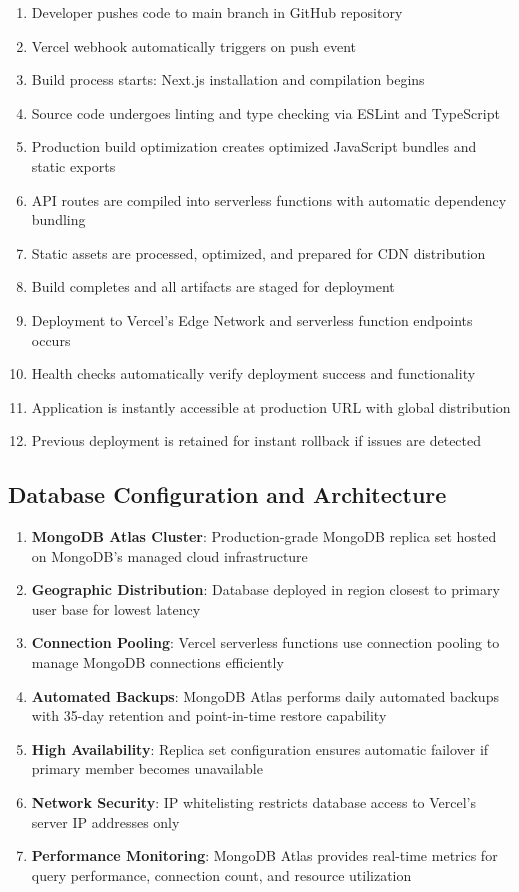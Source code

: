 \documentclass[12pt,a4paper]{report}
\begin{document}
\begin{enumerate}[label=\roman*)]
    \item Developer pushes code to main branch in GitHub repository
    \item Vercel webhook automatically triggers on push event
    \item Build process starts: Next.js installation and compilation begins
    \item Source code undergoes linting and type checking via ESLint and TypeScript
    \item Production build optimization creates optimized JavaScript bundles and static exports
    \item API routes are compiled into serverless functions with automatic dependency bundling
    \item Static assets are processed, optimized, and prepared for CDN distribution
    \item Build completes and all artifacts are staged for deployment
    \item Deployment to Vercel's Edge Network and serverless function endpoints occurs
    \item Health checks automatically verify deployment success and functionality
    \item Application is instantly accessible at production URL with global distribution
    \item Previous deployment is retained for instant rollback if issues are detected
\end{enumerate}

\subsection{Database Configuration and Architecture}

\begin{enumerate}[label=\roman*)]
    \item \textbf{MongoDB Atlas Cluster}: Production-grade MongoDB replica set hosted on MongoDB's managed cloud infrastructure
    \item \textbf{Geographic Distribution}: Database deployed in region closest to primary user base for lowest latency
    \item \textbf{Connection Pooling}: Vercel serverless functions use connection pooling to manage MongoDB connections efficiently
    \item \textbf{Automated Backups}: MongoDB Atlas performs daily automated backups with 35-day retention and point-in-time restore capability
    \item \textbf{High Availability}: Replica set configuration ensures automatic failover if primary member becomes unavailable
    \item \textbf{Network Security}: IP whitelisting restricts database access to Vercel's server IP addresses only
    \item \textbf{Performance Monitoring}: MongoDB Atlas provides real-time metrics for query performance, connection count, and resource utilization
\end{enumerate}
\end{document}
